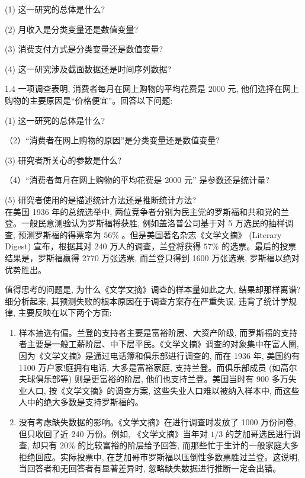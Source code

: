 \documentclass[10pt]{article}
\begin{document}
\begin{CJK*}{UTF8}{bsmi}
(1) 这一研究的总体是什么?

(2) 月收入是分类变量还是数值变量?

(3) 消费支付方式是分类变量还是数值变量?

(4) 这一研究涉及截面数据还是时间序列数据?

1.4 一项调查表明, 消费者每月在网上购物的平均花费是 2000 元, 他们选择在网上购物的主要原因是“价格便宜”。回答以下问题:

(1) 这一研究的总体是什么?

（2）“消费者在网上购物的原因”是分类变量还是数值变量?

(3) 研究者所关心的参数是什么?

（4）“消费者每月在网上购物的平均花费是 2000 元” 是参数还是统计量?

(5) 研究者使用的是描述统计方法还是推断统计方法?\\

在美国 1936 年的总统选举中, 两位竞争者分别为民主党的罗斯福和共和党的兰登。一般民意测验认为罗斯福将获胜, 例如盖洛普公司基于对 5 万选民的抽样调查, 预测罗斯福的得票率为 $56 \%$ 。但是美国著名杂志《文学文摘》 (Literary Digest) 宣布，根据其对 240 万人的调查，兰登将获得 $57 \%$ 的选票。最后的投票结果是，罗斯福赢得 2770 万张选票, 而兰登只得到 1600 万张选票, 罗斯福以绝对优势胜出。

值得思考的问题是, 为什么《文学文摘》调查的样本量如此之大, 结果却那样离谱? 细分析起来, 其预测失败的根本原因在于调查方案存在严重失误, 违背了统计学规律, 主要反映在以下两个方面:

\begin{enumerate}
  \item 样本抽选有偏。兰登的支持者主要是富裕阶层、大资产阶级, 而罗斯福的支持者主要是一般工薪阶层、中下层平民。《文学文摘》调查的对象集中在富人圈, 因为《文学文摘》是通过电话簿和俱乐部进行调查的, 而在 1936 年, 美国约有 1100 万户家!庭拥有电话, 大多是富裕家庭, 支持兰登。而俱乐部成员 (如高尔夫球俱乐部等) 则是更富裕的阶层, 他们也支持兰登。美国当时有 900 多万失业人口, 按《文学文摘》的调查方案, 这些失业人口难以被纳入样本中, 而这些人中的绝大多数是支持罗斯福的。

  \item 没有考虑缺失数据的影响。《文学文摘》在进行调查时发放了 1000 万份问卷,但只收回了近 240 万份。例如, 《文学文摘》当年对 $1 / 3$ 的芝加哥选民进行调查, 却只有 $20 \%$ 的比较富裕的阶层给予回答, 而那些忙于生计的一般家庭大多拒绝回应。实际投票中, 在芝加哥市罗斯福以压倒性多数票胜过兰登。这说明, 当回答者和无回答者有显著差异时, 忽略缺失数据进行推断一定会出错。


\end{enumerate}
\end{CJK*}
\end{document}
